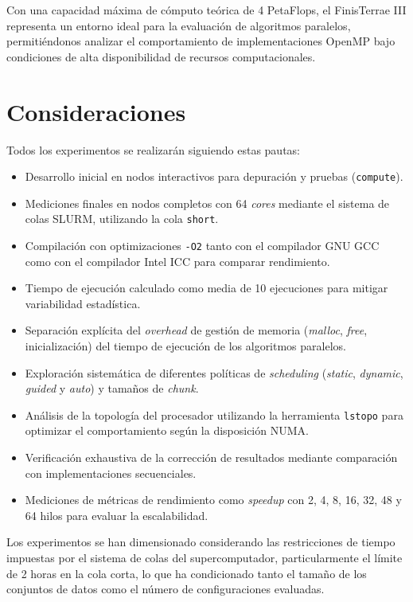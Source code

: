 Con una capacidad máxima de cómputo teórica de 4 PetaFlops, el FinisTerrae III representa un entorno ideal para la evaluación de algoritmos paralelos, permitiéndonos analizar el comportamiento de implementaciones OpenMP bajo condiciones de alta disponibilidad de recursos computacionales.

\newpage

\section{Consideraciones}
	
Todos los experimentos se realizarán siguiendo estas pautas:
    
\begin{itemize}

    \item Desarrollo inicial en nodos interactivos para depuración y pruebas (\texttt{compute}).
    
    \item Mediciones finales en nodos completos con 64 \textit{cores} mediante el sistema de colas SLURM, utilizando la cola \texttt{short}.
    
    \item Compilación con optimizaciones \texttt{-O2} tanto con el compilador GNU GCC como con el compilador Intel ICC para comparar rendimiento.
    
    \item Tiempo de ejecución calculado como media de 10 ejecuciones para mitigar variabilidad estadística.
    
    \item Separación explícita del \textit{overhead} de gestión de memoria (\textit{malloc}, \textit{free}, inicialización) del tiempo de ejecución de los algoritmos paralelos.
    
    \item Exploración sistemática de diferentes políticas de \textit{scheduling} (\textit{static}, \textit{dynamic}, \textit{guided} y \textit{auto}) y tamaños de \textit{chunk}.
    
    \item Análisis de la topología del procesador utilizando la herramienta \texttt{lstopo} para optimizar el comportamiento según la disposición NUMA.
    
    \item Verificación exhaustiva de la corrección de resultados mediante comparación con implementaciones secuenciales.
    
    \item Mediciones de métricas de rendimiento como \textit{speedup} con 2, 4, 8, 16, 32, 48 y 64 hilos para evaluar la escalabilidad.
    
\end{itemize}
	
Los experimentos se han dimensionado considerando las restricciones de tiempo impuestas por el sistema de colas del supercomputador, particularmente el límite de 2 horas en la cola corta, lo que ha condicionado tanto el tamaño de los conjuntos de datos como el número de configuraciones evaluadas.